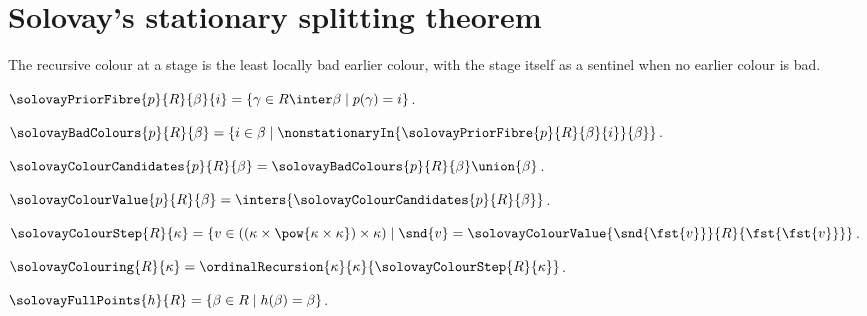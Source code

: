 \section{Solovay's stationary splitting theorem}





The recursive colour at a stage is the least locally bad earlier colour, with
the stage itself as a sentinel when no earlier colour is bad.

\begin{definition}\label{solovay_prior_fibre}
    $\solovayPriorFibre{p}{R}{\beta}{i}
        =\{\gamma\in R\inter\beta\mid p(\gamma)=i\}$.
\end{definition}

\begin{definition}\label{solovay_bad_colours}
    $\solovayBadColours{p}{R}{\beta}
        =\{i\in\beta\mid
            \nonstationaryIn{\solovayPriorFibre{p}{R}{\beta}{i}}{\beta}\}$.
\end{definition}

\begin{definition}\label{solovay_colour_candidates}
    $\solovayColourCandidates{p}{R}{\beta}
        =\solovayBadColours{p}{R}{\beta}\union\{\beta\}$.
\end{definition}

\begin{definition}\label{solovay_colour_value}
    $\solovayColourValue{p}{R}{\beta}
        =\inters{\solovayColourCandidates{p}{R}{\beta}}$.
\end{definition}

\begin{definition}\label{solovay_colour_step}
    $\solovayColourStep{R}{\kappa}
        =\{v\in((\kappa\times\pow{\kappa\times\kappa})\times\kappa)
            \mid \snd{v}=\solovayColourValue
                {\snd{\fst{v}}}{R}{\fst{\fst{v}}}\}$.
\end{definition}

\begin{definition}\label{solovay_colouring}
    $\solovayColouring{R}{\kappa}
        =\ordinalRecursion{\kappa}{\kappa}{\solovayColourStep{R}{\kappa}}$.
\end{definition}

\begin{definition}\label{solovay_full_points}
    $\solovayFullPoints{h}{R}=\{\beta\in R\mid h(\beta)=\beta\}$.
\end{definition}

